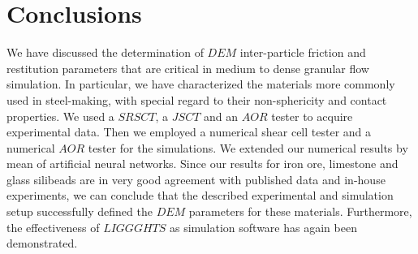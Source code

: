 
\section{Conclusions}
\label{sec:conclusions}

We have discussed the determination of $DEM$ inter-particle friction and restitution parameters that are critical in medium to dense granular flow simulation.
In particular, we have characterized the materials more commonly used in steel-making, with special regard to their non-sphericity and contact properties.
We used a $SRSCT$, a $JSCT$ and an $AOR$ tester to acquire experimental data. 
Then we employed a numerical shear cell tester and a numerical $AOR$ tester for the simulations.
We extended our numerical results by mean of artificial neural networks.
Since our results for iron ore, limestone and glass silibeads are in very good agreement with published data and in-house experiments, we can conclude that the described experimental and simulation setup successfully defined the $DEM$ parameters for these materials. 
Furthermore, the effectiveness of $LIGGGHTS$ as simulation software has again been demonstrated.\\

